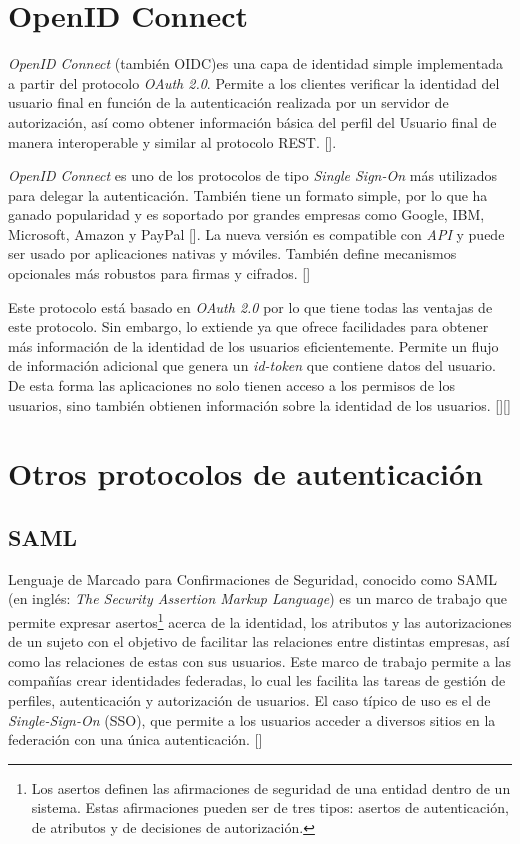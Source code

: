 \section{OpenID Connect}
\textit{OpenID Connect}  (también OIDC)es una capa de identidad simple implementada a partir del protocolo \textit{OAuth 2.0}. Permite a los clientes verificar la identidad del usuario final en función de la autenticación realizada por un servidor de autorización, así como obtener información básica del perfil del Usuario final de manera interoperable y similar al protocolo REST. [\cite{openid-doc}]. 

\textit{OpenID Connect }es uno de los protocolos de tipo \textit{Single Sign-On} más utilizados para delegar la autenticación. También tiene un formato simple, por lo que ha ganado popularidad y es soportado por grandes empresas como Google, IBM, Microsoft, Amazon y PayPal [\cite{mainka2017sok}]. La nueva versión es compatible con \textit{API} y puede ser usado por aplicaciones nativas y móviles. También define mecanismos opcionales más robustos para firmas y cifrados. [\cite{openid-doc}]

Este protocolo está basado en \textit{OAuth 2.0} por lo que tiene todas las ventajas de este protocolo. Sin embargo, lo extiende ya que ofrece facilidades para obtener más información de la identidad de los usuarios eficientemente. Permite un flujo de información adicional que genera un \textit{id-token} que contiene datos del usuario. De esta forma las aplicaciones no solo tienen acceso a los permisos de los usuarios, sino también obtienen información sobre la identidad de los usuarios.  [\cite{openid-doc}][\cite{kutera2016single}]

\section{Otros protocolos de autenticación}
\subsection{SAML}
Lenguaje de Marcado para Confirmaciones de Seguridad, conocido como SAML (en inglés: \textit{The Security Assertion Markup Language}) es un marco de trabajo que permite expresar asertos\footnote{ Los asertos definen las afirmaciones de seguridad de una entidad dentro de un sistema. Estas afirmaciones pueden ser de tres tipos: asertos de autenticación, de atributos y de decisiones de autorización.} acerca de la identidad, los atributos y las autorizaciones de un sujeto con el objetivo de facilitar las relaciones entre distintas empresas, así como las relaciones de estas con sus usuarios. Este marco de trabajo permite a las compañías crear identidades federadas, lo cual les facilita las tareas de gestión de perfiles, autenticación y autorización de usuarios. El caso típico de uso es el de \textit{Single-Sign-On }(SSO), que permite a los usuarios acceder a diversos sitios en la federación con una única autenticación. [\cite{sanchez2009estudio}]

